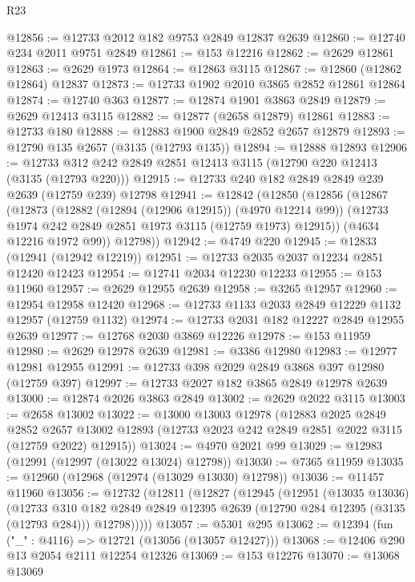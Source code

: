 \begin{lexlean}{R23}
\begin{coremodule}
@12856 := @12733 @2012 @182 @9753 @2849 @12837 @2639
@12860 := @12740 @234 @2011 @9751 @2849
@12861 := @153 @12216
@12862 := @2629 @12861
@12863 := @2629 @1973
@12864 := @12863 @3115
@12867 := @12860 (@12862 @12864) @12837
@12873 := @12733 @1902 @2010 @3865 @2852 @12861 @12864
@12874 := @12740 @363
@12877 := @12874 @1901 @3863 @2849
@12879 := @2629 @12413 @3115
@12882 := @12877 (@2658 @12879) @12861
@12883 := @12733 @180
@12888 := @12883 @1900 @2849 @2852 @2657 @12879
@12893 := @12790 @135 @2657 (@3135 (@12793 @135))
@12894 := @12888 @12893
@12906 := @12733 @312 @242 @2849 @2851 @12413 @3115 (@12790 @220 @12413 (@3135 (@12793 @220)))
@12915 := @12733 @240 @182 @2849 @2849 @239 @2639 (@12759 @239) @12798
@12941 := @12842
    (@12850
      (@12856
        (@12867
          (@12873
            (@12882 (@12894 (@12906 @12915)) (@4970 @12214 @99))
            (@12733 @1974 @242 @2849 @2851 @1973 @3115 (@12759 @1973) @12915))
          (@4634 @12216 @1972 @99))
        @12798))
@12942 := @4749 @220
@12945 := @12833 (@12941 (@12942 @12219))
@12951 := @12733 @2035 @2037 @12234 @2851 @12420 @12423
@12954 := @12741 @2034 @12230 @12233
@12955 := @153 @11960
@12957 := @2629 @12955 @2639
@12958 := @3265 @12957
@12960 := @12954 @12958 @12420
@12968 := @12733 @1133 @2033 @2849 @12229 @1132 @12957 (@12759 @1132)
@12974 := @12733 @2031 @182 @12227 @2849 @12955 @2639
@12977 := @12768 @2030 @3869 @12226
@12978 := @153 @11959
@12980 := @2629 @12978 @2639
@12981 := @3386 @12980
@12983 := @12977 @12981 @12955
@12991 := @12733 @398 @2029 @2849 @3868 @397 @12980 (@12759 @397)
@12997 := @12733 @2027 @182 @3865 @2849 @12978 @2639
@13000 := @12874 @2026 @3863 @2849
@13002 := @2629 @2022 @3115
@13003 := @2658 @13002
@13022 := @13000
    @13003
    @12978
    (@12883
      @2025
      @2849
      @2852
      @2657
      @13002
      @12893
      (@12733 @2023 @242 @2849 @2851 @2022 @3115 (@12759 @2022) @12915))
@13024 := @4970 @2021 @99
@13029 := @12983 (@12991 (@12997 (@13022 @13024) @12798))
@13030 := @7365 @11959
@13035 := @12960 (@12968 (@12974 (@13029 @13030) @12798))
@13036 := @11457 @11960
@13056 := @12732
    (@12811
      (@12827
        (@12945
          (@12951
            (@13035 @13036)
            (@12733
              @310
              @182
              @2849
              @2849
              @12395
              @2639
              (@12790 @284 @12395 (@3135 (@12793 @284)))
              @12798)))))
@13057 := @5301 @295
@13062 := @12394 (fun ("_" : @4116) => @12721 (@13056 (@13057 @12427)))
@13068 := @12406 @290 @13 @2054 @2111 @12254 @12326
@13069 := @153 @12276
@13070 := @13068 @13069

\end{coremodule}
\end{lexlean}
